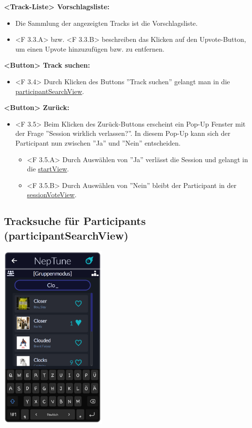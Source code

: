\documentclass[oneside, ngerman]{sdqtechreport}
\begin{document}
\textbf{<Track-Liste> Vorschlagsliste:}
\begin{itemize}
    \item Die Sammlung der angezeigten Tracks ist die Vorschlagsliste.
    \item <F 3.3.A> bzw. <F 3.3.B> beschreiben das Klicken auf den Upvote-Button, um einen Upvote hinzuzufügen bzw. zu entfernen.
\end{itemize}

\textbf{<Button> Track suchen:}
\begin{itemize}
    \item <F 3.4> Durch Klicken des Buttons ''Track suchen'' gelangt man in die \hyperlink{participantSearchView}{participantSearchView}.
\end{itemize}

\textbf{<Button> Zurück:}
\begin{itemize}
    \item <F 3.5> Beim Klicken des Zurück-Buttons erscheint ein Pop-Up Fenster mit der Frage ''Session wirklich verlassen?''. In diesem Pop-Up kann sich der Participant nun zwischen ''Ja'' und ''Nein'' entscheiden.
    \begin{itemize}
        \item <F 3.5.A> Durch Auswählen von ''Ja'' verlässt die Session und gelangt in die \hyperlink{startView}{startView}.
        \item <F 3.5.B> Durch Auswählen von ''Nein'' bleibt der Participant in der \hyperlink{sessionVoteView}{sessionVoteView}.
    \end{itemize}
\end{itemize}

\subsection{Tracksuche für Participants (participantSearchView)}
\label{sec:Benutzeroberfläche:participantSearchView}


\begin{center}
    \hypertarget{participantSearchView}{}
    \includegraphics[width=0.4\textwidth]{LATEX/Pflichtenheft/GraphicDesigns/userSearchPage.png}
\end{center}
\end{document}
